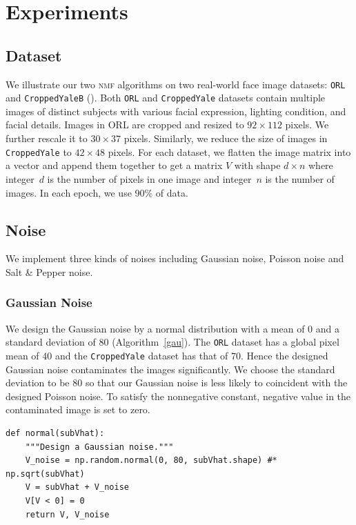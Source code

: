 \section{Experiments}\label{chapter4}

\subsection{Dataset}
We illustrate our two \textsc{nmf} algorithms on two real-world face image datasets: \texttt{ORL} and \texttt{CroppedYaleB} (\citet{belhumeur1997eigenfaces}).
Both \texttt{ORL} and \texttt{CroppedYale} datasets contain multiple images of distinct subjects with various facial expression, lighting condition, and facial details.
Images in ORL are cropped and resized to $92 \times 112$ pixels. We further rescale it to $30 \times 37$ pixels. Similarly, we reduce the size of images in \texttt{CroppedYale} to $42 \times 48$ pixels.
For each dataset, we flatten the image matrix into a vector and append them together to get a matrix $V$ with shape $d\times n$ where integer~$d$ is the number of pixels in one image and integer~$n$ is the number of images. In each epoch, we use 90\% of data.

\subsection{Noise}
We implement three kinds of noises including Gaussian noise, Poisson noise and Salt \& Pepper noise.
\subsubsection{Gaussian Noise}\label{sec:gau}
We design the Gaussian noise by a normal distribution with a mean of $0$ and a standard deviation of $80$ (Algorithm~\ref{gau}). The \texttt{ORL} dataset has a global pixel mean of $40$ and the \texttt{CroppedYale} dataset has that of $70$. Hence the designed Gaussian noise contaminates the images significantly. We choose the standard deviation to be $80$ so that our Gaussian noise is less likely to coincident with the designed Poisson noise. To satisfy the nonnegative constant, negative value in the contaminated image is set to zero.
\begin{lstlisting}[caption= Gaussian Noise Design, label=gau]
def normal(subVhat):
    """Design a Gaussian noise."""
    V_noise = np.random.normal(0, 80, subVhat.shape) #* np.sqrt(subVhat)
    V = subVhat + V_noise
    V[V < 0] = 0
    return V, V_noise
\end{lstlisting}


